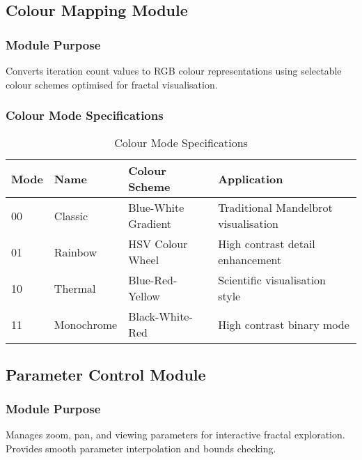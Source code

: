 \documentclass[11pt,a4paper]{article}
\begin{document}
\subsection{Colour Mapping Module}

\subsubsection{Module Purpose}
Converts iteration count values to RGB colour representations using selectable colour schemes optimised for fractal visualisation.

\subsubsection{Colour Mode Specifications}
\begin{table}[h]
\centering
\begin{tabularx}{\textwidth}{|l|l|l|X|}
\hline
\rowcolor{purple!20}
\textbf{Mode} & \textbf{Name} & \textbf{Colour Scheme} & \textbf{Application} \\
\hline
00 & Classic & Blue-White Gradient & Traditional Mandelbrot visualisation \\
01 & Rainbow & HSV Colour Wheel & High contrast detail enhancement \\
10 & Thermal & Blue-Red-Yellow & Scientific visualisation style \\
11 & Monochrome & Black-White-Red & High contrast binary mode \\
\hline
\end{tabularx}
\caption{Colour Mode Specifications}
\end{table}

\subsection{Parameter Control Module}

\subsubsection{Module Purpose}
Manages zoom, pan, and viewing parameters for interactive fractal exploration. Provides smooth parameter interpolation and bounds checking.
\end{document}
